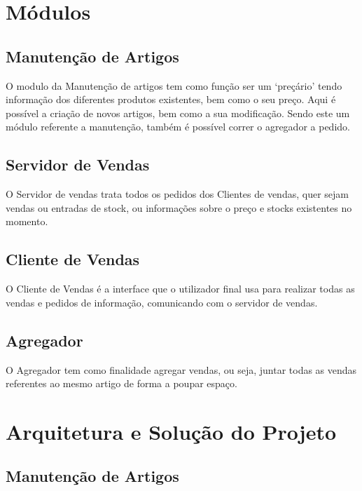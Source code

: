 \documentclass[a4paper]{report}
\begin{document}
\chapter{Módulos}\label{chap:api}

\section{Manutenção de Artigos}

O modulo da Manutenção de artigos tem como função ser um `preçário'
tendo informação dos diferentes produtos existentes, bem como o seu
preço. Aqui é possível a criação de novos artigos, bem como a sua
modificação. Sendo este um módulo referente a manutenção, também
é possível correr o agregador a pedido.

\section{Servidor de Vendas}

O Servidor de vendas trata todos os pedidos dos Clientes de vendas,
quer sejam vendas ou entradas de stock, ou informações sobre o preço
e stocks existentes no momento.

\section{Cliente de Vendas}

O Cliente de Vendas é a interface que o utilizador final usa para
realizar todas as vendas e pedidos de informação, comunicando com
o servidor de vendas.

\section{Agregador}

O Agregador tem como finalidade agregar vendas, ou seja, juntar
todas as vendas referentes ao mesmo artigo de forma a poupar
espaço.

\chapter{Arquitetura e Solução do Projeto}

\section{Manutenção de Artigos}
\end{document}
